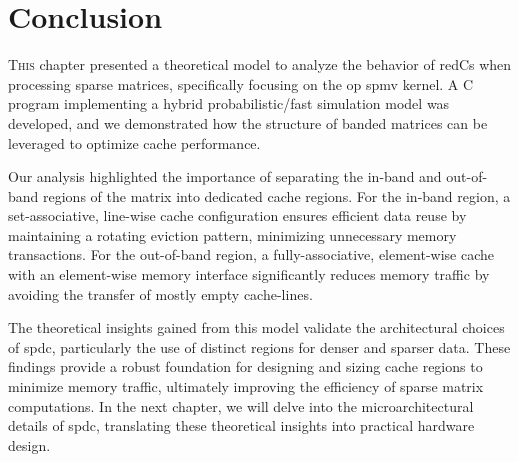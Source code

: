 
\section{Conclusion}
\label{sec:theory:conclu}

\lettrine{T}{his} chapter presented a theoretical model to analyze the behavior of \glspl{redC} when processing sparse matrices, specifically focusing on the \acrshort{op} \acrshort{spmv} kernel.
A C program implementing a hybrid probabilistic/fast simulation model was developed, and we demonstrated how the structure of \gls{banded} matrices can be leveraged to optimize cache performance.

Our analysis highlighted the importance of separating the in-\gls{band} and out-of-\gls{band} regions of the matrix into dedicated cache regions.
For the in-\gls{band} region, a \gls{set}-associative, line-wise cache configuration ensures efficient data reuse by maintaining a rotating \gls{eviction} pattern, minimizing unnecessary memory transactions.
For the out-of-\gls{band} region, a fully-associative, element-wise cache with an element-wise memory interface significantly reduces memory traffic by avoiding the transfer of mostly empty cache-lines.

The theoretical insights gained from this model validate the architectural choices of \acrlong{spdc}, particularly the use of distinct regions for denser and sparser data.
These findings provide a robust foundation for designing and sizing cache regions to minimize memory traffic, ultimately improving the efficiency of sparse matrix computations.
In the next chapter, we will delve into the microarchitectural details of \acrlong{spdc}, translating these theoretical insights into practical hardware design.

\bigskip\bigskip

